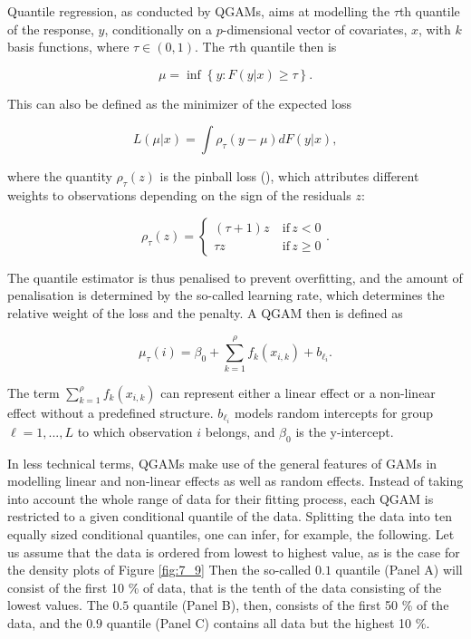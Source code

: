 Quantile regression, as conducted by QGAMs, aims at modelling the $\tau$th quantile of the response, $y$, conditionally on a $p$-dimensional vector of covariates, $x$, with $k$ basis functions, where $\tau \in (0,1)$. The $\tau$th quantile then is 

\begin{equation}
\label{eq:mu}
    \mu=\inf \left \{ y:F(y|x)\geq \tau \right \}.
\end{equation}

This can also be defined as the minimizer of the expected loss

\begin{equation}
\label{eq:Lmux}
    L(\mu|x)=\int \rho_{\tau}(y-\mu)dF(y|x),
\end{equation}

where the quantity $\rho_{\tau}(z)$ is the pinball loss (\cite{Koenker2005, Gneiting2011}), which attributes different weights to observations depending on the sign of the residuals $z$:

\begin{equation}
\label{eq:rhotauz}
    \rho_{\tau}(z)=\left \{ \begin{matrix}
    (\tau+1)z\ & \mathrm{if}\, z<0\\ 
    \tau z & \mathrm{if} \, z\geq 0
    \end{matrix} \right..
\end{equation}

The quantile estimator is thus penalised to prevent overfitting, and the amount of penalisation is determined by the so-called learning rate, which determines the relative weight of the loss and the penalty. A QGAM then is defined as

\begin{equation}
\label{eq:mutaui}
    \mu_{\tau}(i)=\beta_{0}+\sum_{k=1}^{\rho}f_{k}(x_{i,k})+b_{\ell_{i}}.
\end{equation}

The term $\sum_{k=1}^{\rho}f_{k}(x_{i,k})$ can represent either a linear effect or a non-linear effect without a predefined structure. $b_{\ell_{i}}$ models random intercepts for group $\ell=1,...,L$ to which observation $i$ belongs, and $\beta_{0}$ is the y-intercept.

In less technical terms, QGAMs make use of the general features of GAMs in modelling linear and non-linear effects as well as random effects. Instead of taking into account the whole range of data for their fitting process, each QGAM is restricted to a given conditional quantile of the data. Splitting the data into ten equally sized conditional quantiles, one can infer, for example, the following. Let us assume that the data is ordered from lowest to highest value, as is the case for the density plots of Figure \ref{fig:7_9} Then the so-called $0.1$ quantile (Panel A) will consist of the first 10 \% of data, that is the tenth of the data consisting of the lowest values. The $0.5$ quantile (Panel B), then, consists of the first 50 \% of the data, and the $0.9$ quantile (Panel C) contains all data but the highest 10 \%. 

